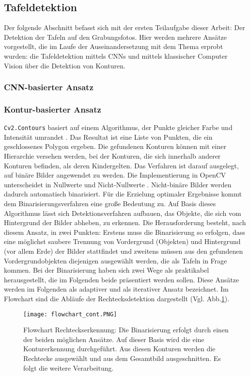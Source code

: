 \subsection{Tafeldetektion}

Der folgende Abschnitt befasst sich mit der ersten Teilaufgabe dieser Arbeit: Der Detektion der Tafeln auf den Grabungsfotos. Hier werden mehrere Ansätze vorgestellt, die im Laufe der Auseinandersetzung mit dem Thema erprobt wurden: die Tafeldetektion mittels CNNs und mittels klassischer Computer Vision über die Detektion von Konturen.

\subsubsection{CNN-basierter Ansatz}

\subsubsection{Kontur-basierter Ansatz}

\verb|Cv2.Contours| basiert auf einem Algorithmus, der Punkte gleicher Farbe und Intensität umrandet \cite{findcontours}. Das Resultat ist eine Liste von Punkten, die ein geschlossenes Polygon ergeben. Die gefundenen Konturen können mit einer Hierarchie versehen werden, bei der Konturen, die sich innerhalb anderer Konturen befinden, als deren \glqq Kinder\grqq gelten. Das Verfahren ist darauf ausgelegt, auf binäre Bilder angewendet zu werden. Die Implementierung in OpenCV unterscheidet in Nullwerte und Nicht-Nullwerte \cite{opencvcontours}. Nicht-binäre Bilder werden dadurch automatisch binarisiert. Für die Erzielung optimaler Ergebnisse kommt dem Binarisierungsverfahren eine große Bedeutung zu.
Auf Basis dieses Algorithmus lässt sich Detektionsverfahren aufbauen, das Objekte, die sich vom Hintergrund der Bilder abheben, zu erkennen. Die Herausforderung besteht, nach diesem Ansatz, in zwei Punkten: Erstens muss die Binarisierung so erfolgen, dass eine möglichst saubere Trennung von Vordergrund (Objekten) und Hintergrund (vor allem Erde) der Bilder stattfindet und zweitens müssen aus den gefundenen Vordergrundobjekten diejenigen ausgewählt werden, die als Tafeln in Frage kommen. Bei der Binarisierung haben sich zwei Wege als praktikabel herausgestellt, die im Folgenden beide präsentiert werden sollen. Diese Ansätze werden im Folgenden als adaptiver und als iterativer Ansatz bezeichnet. Im Flowchart sind die Abläufe der Rechtecksdetektion dargestellt (Vgl. Abb.\ref{fig:flowrectdetect}).
\begin{figure}[h!]
\centering
\texttt{[image: flowchart\_cont.PNG]}
\caption{Flowchart Rechteckserkennung: Die Binarisierung erfolgt durch einen der beiden möglichen Ansätze. Auf dieser Basis wird die eine Konturerkennung durchgeführt. Aus diesen Konturen werden die Rechtecke ausgewählt und aus dem Gesamtbild ausgeschnitten. Es folgt die weitere Verarbeitung.}
\label{fig:flowrectdetect}
\end{figure}

